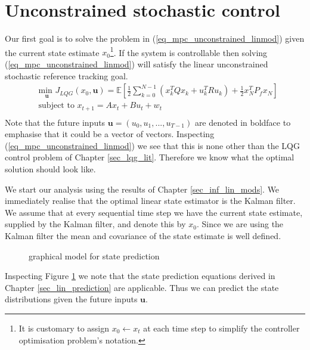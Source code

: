 \section{Unconstrained stochastic control}
\label{sec_uncon_lin_control}
Our first goal is to solve the problem in (\ref{eq_mpc_unconstrained_linmod}) given the current state estimate $x_0$\footnote{It is customary to assign $x_0 \leftarrow x_t$ at each time step to simplify the controller optimisation problem's notation.}. If the system is controllable then solving (\ref{eq_mpc_unconstrained_linmod}) will satisfy the linear unconstrained stochastic reference tracking goal.
\begin{equation}
\begin{aligned}
&\underset{\mathbf{u}}{\text{min }} J_{LQG}(x_0, \mathbf{u}) = \mathbb{E}\left[ \frac{1}{2}\sum_{k=0}^{N-1} \left( x_k^TQx_k + u_k^TRu_k \right) + \frac{1}{2}x_N^TP_fx_N \right] \\
& \text{subject to } x_{t+1}=Ax_t+Bu_t + w_t\\
\end{aligned}
\label{eq_mpc_unconstrained_linmod}
\end{equation}
Note that the future inputs $\mathbf{u}=(u_0, u_1,...,u_{T-1})$ are denoted in boldface to emphasise that it could be a vector of vectors. Inspecting (\ref{eq_mpc_unconstrained_linmod}) we see that this is none other than the LQG control problem of Chapter \ref{sec_lqg_lit}. Therefore we know what the optimal solution should look like.

We start our analysis using the results of Chapter \ref{sec_inf_lin_mods}. We immediately realise that the optimal linear state estimator is the Kalman filter. We assume that at every sequential time step we have the current state estimate, supplied by the Kalman filter, and denote this by $x_0$. Since we are using the Kalman filter the mean and covariance of the state estimate is well defined. 
\begin{figure}[H] 
\centering
{}
\caption{graphical model for state prediction}
\label{fig_gm_mpc}
\end{figure}
Inspecting Figure \ref{fig_gm_mpc} we note that the state prediction equations derived in Chapter \ref{sec_lin_prediction} are applicable. Thus we can predict the state distributions given the future inputs $\mathbf{u}$.

